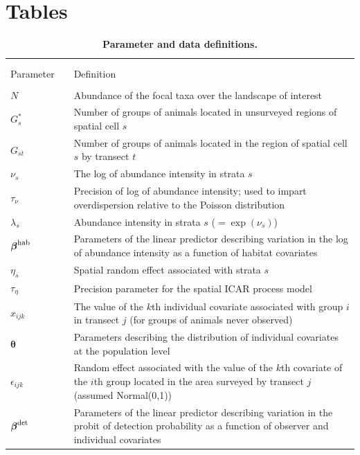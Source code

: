 \documentclass[10pt]{article}
\begin{document}
\section*{Tables}

\begin{table}
\caption{\bf Parameter and data definitions.}
\begin{tabular}{p{1.5cm}l p{12.5cm}}
\hline \hline \\
& & \\
Parameter & & Definition \\
\cline{1-1} \cline{3-3}
& & \\
$N$ & & Abundance of the focal taxa over the landscape of interest\\
$G_s^*$ & & Number of groups of animals located in unsurveyed regions of spatial cell $s$\\
$G_{st}$   & & Number of groups of animals located in the region of spatial cell $s$ by transect $t$\\
$\nu_{s}$ & & The log of abundance intensity in strata $s$\\
$\tau_\nu$ & & Precision of log of abundance intensity; used to impart overdispersion relative to the Poisson distribution \\
$\lambda_{s}$ & & Abundance intensity in strata $s$ ($=\exp(\nu_s)$)\\
$\boldsymbol{\beta}^{\rm hab}$ & & Parameters of the linear predictor describing variation in
        the log of abundance intensity as a function of habitat covariates\\
$\eta_s$ & & Spatial random effect associated with strata $s$\\
$\tau_\eta$ & & Precision parameter for the spatial ICAR process model\\
$x_{ijk}$   & &  The value of the $k$th individual covariate associated with
    group $i$ in transect $j$ (for groups of animals never observed)\\
$\boldsymbol{\theta}$ & & Parameters describing the distribution of individual covariates
                          at the population level \\
$\epsilon_{ijk}$ & & Random effect associated with the value of the $k$th covariate of the
                $i$th group located in the area surveyed by transect $j$ (assumed Normal(0,1))\\
$\boldsymbol{\beta}^{\rm det}$ & & Parameters of the linear predictor describing variation
        in the probit of detection probability as a function of observer and individual covariates \\

\end{tabular}
\end{table}
\end{document}
